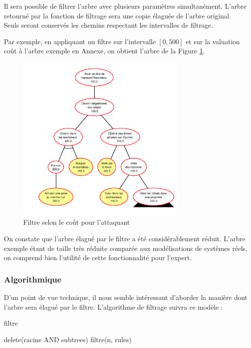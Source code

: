 		Il sera possible de filtrer l'arbre avec plusieurs paramètres simultanément.
		L'arbre retourné par la fonction de filtrage sera une copie élaguée de l'arbre original. Seuls seront conservés les chemins respectant les intervalles de filtrage.

		Par exemple, en appliquant un filtre sur l'intervalle $[0, 500]$ et sur la valuation \og coût \fg à l'arbre exemple en Annexe, on obtient l'arbre de la Figure \ref{fig:arbre_post_filtre}.

		\begin{figure}[h!]
			\begin{center}
				\includegraphics[width=0.75\textwidth]{figure/post_filtre.pdf}
			\end{center}
			\caption{Filtre selon le coût pour l'attaquant}
			\label{fig:arbre_post_filtre}
		\end{figure}
		On constate que l'arbre élagué par le filtre a été considérablement réduit. L'arbre exemple étant de taille très réduite comparée aux modélisations de systèmes réels, on comprend bien l'utilité de cette fonctionnalité pour l'expert.

			\subsubsection{Algorithmique}
		D'un point de vue technique, il nous semble intéressant d'aborder la manière dont l'arbre sera élagué par le filtre.
		L'algorithme de filtrage suivra ce modèle :

		\begin{algorithm}
			\caption{filtre}
		\begin{algorithmic}
						\STATE delete(racine AND subtrees)
						\RETURN
					\ENDIF
				\ENDFOR
					\STATE filtre(n, rules)
				\ENDFOR

		\end{algorithmic}
		\end{algorithm}

